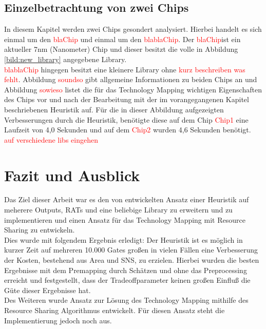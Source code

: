\documentclass[11pt, a4paper, german]{article}
\newcommand{\TM}{Technology  Mapping }
\begin{document}
\subsection{Einzelbetrachtung von zwei Chips}
In diesem Kapitel werden zwei Chips gesondert analysiert. Hierbei handelt es sich einmal um den \textcolor{red}{blaChip} und einmal um den \textcolor{red}{blablaChip}. Der \textcolor{red}{blaChip}ist ein aktueller 7nm (Nanometer) Chip und dieser besitzt die volle in Abbildung \ref{bild:new_library} angegebene Library. \\ 
\textcolor{red}{blablaChip} hingegen besitzt eine kleinere Library ohne \textcolor{red}{kurz beschreiben was fehlt}. Abbildung \textcolor{red}{soundso} gibt allgemeine Informationen zu beiden Chips an und Abbildung \textcolor{red}{sowieso} listet die f\"ur das \TM wichtigen Eigenschaften des Chips vor und nach der Bearbeitung mit der im vorangegangenen Kapitel beschriebenen Heuristik auf. 
F\"ur die in dieser Abbildung aufgezeigten Verbesserungen durch die Heuristik, ben\"otigte diese auf dem Chip \textcolor{red}{Chip1} eine Laufzeit von 4,0 Sekunden und auf dem \textcolor{red}{Chip2} wurden 4,6 Sekunden ben\"otigt.\\

\textcolor{red}{auf verschiedene libs eingehen}
\section{Fazit und Ausblick}
\label{sec:fazit_und_ausblick}
Das Ziel dieser Arbeit war es den von \cite{Elbert} entwickelten Ansatz einer Heuristik auf meherere Outputs, RATs und eine beliebige Library zu erweitern und zu implementieren und einen Ansatz für das \TM mit Resource Sharing zu entwickeln. \\
Dies wurde mit folgendem Ergebnis erledigt: Der Heuristik ist es m\"oglich in kurzer Zeit auf mehreren 10.000 Gates gro{\ss}en in vielen F\"allen eine Verbesserung der Kosten, bestehend aus Area und SNS, zu erzielen. Hierbei wurden die besten Ergebnisse mit dem Premapping durch Sch\"atzen und ohne das Preprocessing erreicht und festgestellt, dass der Tradeoffparameter keinen gro{\ss}en Einflu{\ss} die G\"ute dieser Ergebnisse hat. \\
Des Weiteren wurde Ansatz zur L\"osung des \TM mithilfe des Resource Sharing Algorithmus entwickelt. F\"ur diesen Ansatz steht die Implementierung jedoch noch aus. \\
\end{document}
